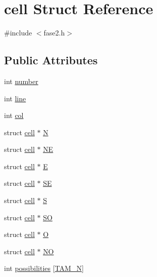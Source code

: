\hypertarget{structcell}{}\section{cell Struct Reference}
\label{structcell}


{\ttfamily \#include $<$fase2.\+h$>$}

\subsection*{Public Attributes}
\begin{DoxyCompactItemize}
\item 
int \mbox{\hyperlink{structcell_a1788c6d7f1749ef7e9e934f4554ff8eb}{number}}
\item 
int \mbox{\hyperlink{structcell_a9f692c876abfe7b2bbd17dc26d9beecf}{line}}
\item 
int \mbox{\hyperlink{structcell_a4418c02be1f04d63892a69d6fc6c1a94}{col}}
\item 
struct \mbox{\hyperlink{structcell}{cell}} $\ast$ \mbox{\hyperlink{structcell_a938ac45ae9a0c85b73461eba9d0d225d}{N}}
\item 
struct \mbox{\hyperlink{structcell}{cell}} $\ast$ \mbox{\hyperlink{structcell_a0b5d80e2f1610b81336e96ad0139e4f1}{NE}}
\item 
struct \mbox{\hyperlink{structcell}{cell}} $\ast$ \mbox{\hyperlink{structcell_a5be3a60b5b62fa56fa3bb8505bdade62}{E}}
\item 
struct \mbox{\hyperlink{structcell}{cell}} $\ast$ \mbox{\hyperlink{structcell_a99d5861d1050146f43f2bbde8d7f3ba9}{SE}}
\item 
struct \mbox{\hyperlink{structcell}{cell}} $\ast$ \mbox{\hyperlink{structcell_a808fa38c56c2edaa1d553d7ee194a1e6}{S}}
\item 
struct \mbox{\hyperlink{structcell}{cell}} $\ast$ \mbox{\hyperlink{structcell_af5298e727ff1bfe3eaa22adc39a8e074}{SO}}
\item 
struct \mbox{\hyperlink{structcell}{cell}} $\ast$ \mbox{\hyperlink{structcell_af562d688067bf164931360b554c371fb}{O}}
\item 
struct \mbox{\hyperlink{structcell}{cell}} $\ast$ \mbox{\hyperlink{structcell_a5cbdcdf78a6dbead8781c747eaa42737}{NO}}
\item 
int \mbox{\hyperlink{structcell_ae1112866a58e5206062ff932b6fd81fd}{possibilities}} \mbox{[}\mbox{\hyperlink{fase2_8h_af0740ca2d3b392c4fa6c2bd62acbc75b}{T\+A\+M\+\_\+N}}\mbox{]}
\end{DoxyCompactItemize}



